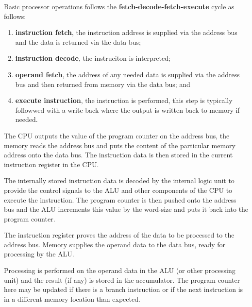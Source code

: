 \begin{definition}
    Basic processor operations follows the \textbf{fetch-decode-fetch-execute} cycle as follows:
    \begin{enumerate}
        \item \textbf{instruction fetch}, the instruction address is supplied via the address bus and the data is returned via the data bus;
        \item \textbf{instruction decode}, the instruciton is interpreted;
        \item \textbf{operand fetch}, the address of any needed data is supplied via the address bus and then returned from memory via the data bus; and
        \item \textbf{execute instruction}, the instruction is performed, this step is typically followwed with a write-back where the output is written back to memory if needed.
    \end{enumerate}
\end{definition}

\begin{definition}
    The CPU outputs the value of the program counter on the address bus, the memory reads the address bus and puts the content of the particular memory address onto the data bus. The instruction data is then stored in the current instruction register in the CPU.
\end{definition}

\begin{definition}
    The internally stored instruction data is decoded by the internal logic unit to provide the control signals to the ALU and other components of the CPU to execute the instruction. The program counter is then pushed onto the address bus and the ALU increments this value by the word-size and puts it back into the program counter. 
\end{definition}

\begin{definition}
    The instruction register proves the address of the data to be processed to the address bus. Memory supplies the operand data to the data bus, ready for processing by the ALU.
\end{definition}

\begin{definition}
    Processing is performed on the operand data in the ALU (or other processing unit) and the result (if any) is stored in the accumulator. The program counter here may be updated if there is a branch instruction or if the next instruction is in a different memory location than expected.
\end{definition}
